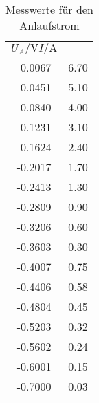 \begin{table}
    \centering
    \begin{tabular}{S S}
        {$U_A / \unit{\volt}$}{$I/\unit{\ampere}$}\\
        -0.0067   & 6.70 \\
        -0.0451   & 5.10 \\
        -0.0840   & 4.00 \\
        -0.1231   & 3.10 \\
        -0.1624   & 2.40 \\
        -0.2017   & 1.70 \\
        -0.2413   & 1.30 \\
        -0.2809   & 0.90 \\
        -0.3206   & 0.60 \\
        -0.3603   & 0.30 \\
        -0.4007   & 0.75 \\
        -0.4406   & 0.58 \\
        -0.4804   & 0.45 \\
        -0.5203   & 0.32 \\
        -0.5602   & 0.24 \\
        -0.6001   & 0.15 \\
        -0.7000   & 0.03 \\        
    \end{tabular}
    \caption{Messwerte für den Anlaufstrom}
    \label{tab:c04}
\end{table}
